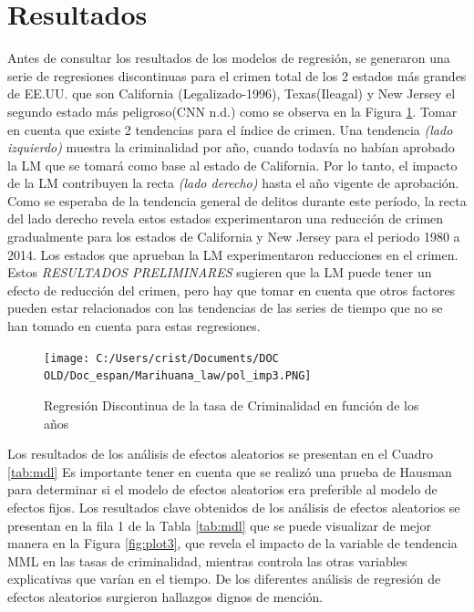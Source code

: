 \documentclass[11pt,]{article}
\begin{document}
\newpage

\hypertarget{resultados}{%
\section{Resultados}\label{resultados}}

Antes de consultar los resultados de los modelos de regresión, se
generaron una serie de regresiones discontinuas para el crimen total de
los 2 estados más grandes de EE.UU. que son California
(Legalizado-1996), Texas(Ileagal) y New Jersey el segundo estado más
peligroso(CNN n.d.) como se observa en la Figura \ref{plot2}. Tomar en
cuenta que existe 2 tendencias para el índice de crimen. Una tendencia
\emph{(lado izquierdo)} muestra la criminalidad por año, cuando todavía
no habían aprobado la LM que se tomará como base al estado de
California. Por lo tanto, el impacto de la LM contribuyen la recta
\emph{(lado derecho)} hasta el año vigente de aprobación. Como se
esperaba de la tendencia general de delitos durante este período, la
recta del lado derecho revela estos estados experimentaron una reducción
de crimen gradualmente para los estados de California y New Jersey para
el periodo 1980 a 2014. Los estados que aprueban la LM experimentaron
reducciones en el crimen. Estos \emph{RESULTADOS PRELIMINARES} sugieren
que la LM puede tener un efecto de reducción del crimen, pero hay que
tomar en cuenta que otros factores pueden estar relacionados con las
tendencias de las series de tiempo que no se han tomado en cuenta para
estas regresiones.

\begin{figure}
\centering
\texttt{[image: C:/Users/crist/Documents/DOC OLD/Doc\_espan/Marihuana\_law/pol\_imp3.PNG]}
\caption{Regresión Discontinua de la tasa de Criminalidad en función de
los años \label{plot2}}
\end{figure}

Los resultados de los análisis de efectos aleatorios se presentan en el
Cuadro \ref{tab:mdl} Es importante tener en cuenta que se realizó una
prueba de Hausman para determinar si el modelo de efectos aleatorios era
preferible al modelo de efectos fijos. Los resultados clave obtenidos de
los análisis de efectos aleatorios se presentan en la fila 1 de la Tabla
\ref{tab:mdl} que se puede visualizar de mejor manera en la Figura
\ref{fig:plot3}, que revela el impacto de la variable de tendencia MML
en las tasas de criminalidad, mientras controla las otras variables
explicativas que varían en el tiempo. De los diferentes análisis de
regresión de efectos aleatorios surgieron hallazgos dignos de mención.
\end{document}
